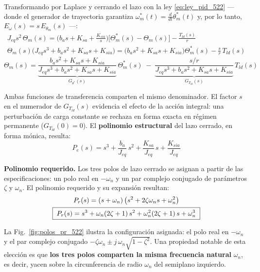 \documentclass[12pt, a4paper,journal, onecolumn, compsoc]{IEEEtran}
\begin{document}
Transformando por Laplace y cerrando el lazo con la ley \eqref{eq:ley_pid_522} --- donde el generador de trayectoria garantiza $\omega_m^*(t)=\frac{d}{dt}\theta_m^*(t)$ y, por lo tanto, $E_\omega(s) = s\,E_{\theta_m}(s)$ ---:
\begin{gather*}
    J_{eq}s^2\,\Theta_m(s) = \Big(b_a s + K_{sa}+\frac{K_{sia}}{s}\Big)\big[\Theta_m^{\ast}(s)-\Theta_m(s)\big] - \frac{T_{ld}(s)}{r}\\
    \Theta_m(s)\Big(J_{eq}s^3+b_as^2 + K_{sa}s+K_{sia}\Big)=\Big(b_as^2 + K_{sa}s+K_{sia}\Big)\Theta_m^{\ast}(s) - \frac{s}{r}\,T_{ld}(s)
\end{gather*}
\begin{equation}
    \Theta_m(s)=\underbrace{\frac{b_as^2 + K_{sa}s+K_{sia}}{J_{eq}s^3+b_as^2 + K_{sa}s+K_{sia}}}_{G_{\theta^*}(s)}\,\Theta_m^{\ast}(s)\;-\;\underbrace{\frac{s/r}{J_{eq}s^3+b_as^2 + K_{sa}s+K_{sia}}}_{G_{T_{ld}}(s)}\,T_{ld}(s)
    \label{eq:tf_lazo_522}
\end{equation}

Ambas funciones de transferencia comparten el mismo denominador. El factor $s$ en el numerador de $G_{T_{ld}}(s)$ evidencia el efecto de la acción integral: una perturbación de carga constante se rechaza en forma exacta en régimen permanente ($G_{T_{ld}}(0)=0$). El \textbf{polinomio estructural} del lazo cerrado, en forma mónica, resulta:
\begin{equation}
    \boxed{\;P_e(s) = s^3+\frac{b_a}{J_{eq}}\,s^2+\frac{K_{sa}}{J_{eq}}\,s+\frac{K_{sia}}{J_{eq}}\;}
    \label{eq:pe_522}
\end{equation}

\textbf{Polinomio requerido.} Los tres polos de lazo cerrado se asignan a partir de las especificaciones: un polo real en $-\omega_n$ y un par complejo conjugado de parámetros $\zeta$ y $\omega_n$. El polinomio requerido y su expansión resultan:
\begin{gather}
    P_r(s) = (s+\omega_n)\left(s^2 + 2\zeta\omega_n s + \omega_n^2\right)\notag\\
    \boxed{\;P_r(s) = s^3 + \omega_n(2\zeta+1)\,s^2 + \omega_n^2(2\zeta+1)\,s + \omega_n^3\;}
    \label{eq:pr_522}
\end{gather}

La Fig.~\ref{fig:polos_pr_522} ilustra la configuración asignada: el polo real en $-\omega_n$ y el par complejo conjugado $-\zeta\omega_n \pm j\,\omega_n\sqrt{1-\zeta^2}$. Una propiedad notable de esta elección es que \textbf{los tres polos comparten la misma frecuencia natural} $\omega_n$, es decir, yacen sobre la circunferencia de radio $\omega_n$ del semiplano izquierdo.
\end{document}
